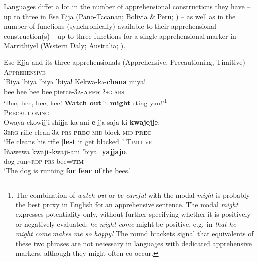 \documentclass[output=paper,colorlinks,citecolor=brown]{langscibook}
\begin{document}
Languages differ a lot in the number of apprehensional constructions they have -- up to three in Ese Ejja (Pano-Tacanan; Bolivia \& Peru; \cite{vuillermet2018a}) -- as well as in the number of functions (synchronically) available to their apprehensional construction(s) -- up to three functions for a single apprehensional marker in Marrithiyel (Western Daly; Australia; \cite{green1989}).


\ea \label{ex:v1} \textnormal{Ese Ejja and its three apprehensionals (Apprehensive, Precautioning, Timitive)}
\ea \label{ex:v1a} \textnormal{\textsc{Apprehensive}} \\
\gll 'Biya 'biya 'biya 'biya! Kekwa-ka-\textbf{chana} miya! \\
bee bee bee bee pierce-\textsc{3a}-\textbf{\textsc{appr}} \textsc{2sg.abs} \\
\glt `Bee, bee, bee, bee! \textbf{Watch out} it \textbf{might} sting you!'\footnote{The combination of \textit{watch out} or \textit{be careful} with the modal \textit{might} is probably the best proxy in English for an apprehensive sentence. The modal \textit{might} expresses potentiality only, without further specifying whether it is positively or negatively evaluated: \textit{he might come} might be positive, e.g.\ in \textit{that he might come makes me so happy!} The round brackets signal that equivalents of these two phrases are not necessary in languages with dedicated apprehensive markers, although they might often co-occur.} \\
\ex \label{ex:v1b} \textnormal{\textsc{Precautioning}} \\
\gll Owaya ekowijji shijja-ka-ani {\ob}\textbf{e}-jja-saja-ki \textbf{kwajejje}{\cb}.\\
\textsc{3erg} rifle clean-\textsc{3a-prs} \textsc{\textbf{prec}-mid-}block-\textsc{mid} \textbf{\textsc{prec}} \\
\glt `He cleans his rifle [\textbf{lest} it get blocked].'
\newpage
\ex \label{ex:v1c} \textnormal{\textsc{Timitive}} \\
\gll Iñawewa kwaji\textasciitilde kwaji-ani 'biya=\textbf{yajjajo}. \\
dog run\textasciitilde\textsc{rdp-prs} bee=\textsc{\textbf{tim}} \\
\glt `The dog is running \textbf{for fear of} the bees.'
\z
\z
\end{document}
